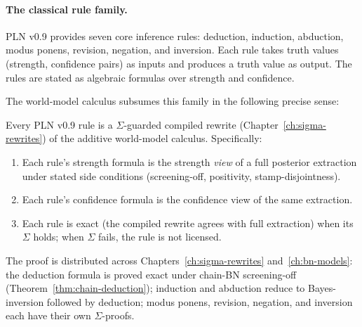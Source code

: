 \paragraph{The classical rule family.}
PLN v0.9 provides seven core inference rules: deduction, induction,
abduction, modus ponens, revision, negation, and inversion.  Each rule
takes truth values (strength, confidence pairs) as inputs and produces
a truth value as output.  The rules are stated as algebraic formulas
over strength and confidence.

The world-model calculus subsumes this family in the following precise
sense:

\begin{theorem}
\label{thm:pln-subsumption}
Every PLN v0.9 rule is a $\Sigma$-guarded compiled rewrite
(Chapter~\ref{ch:sigma-rewrites}) of the additive world-model
calculus.  Specifically:
\begin{enumerate}
\item Each rule's strength formula is the strength \emph{view} of a
  full posterior extraction under stated side conditions
  (screening-off, positivity, stamp-disjointness).
\item Each rule's confidence formula is the confidence view of the
  same extraction.
\item Each rule is exact (the compiled rewrite agrees with full
  extraction) when its $\Sigma$ holds; when $\Sigma$ fails, the
  rule is not licensed.
\end{enumerate}
\end{theorem}

\noindent
The proof is distributed across Chapters~\ref{ch:sigma-rewrites}
and~\ref{ch:bn-models}: the deduction formula is proved exact under
chain-BN screening-off (Theorem~\ref{thm:chain-deduction}); induction
and abduction reduce to Bayes-inversion followed by deduction; modus
ponens, revision, negation, and inversion each have their own
$\Sigma$-proofs.

